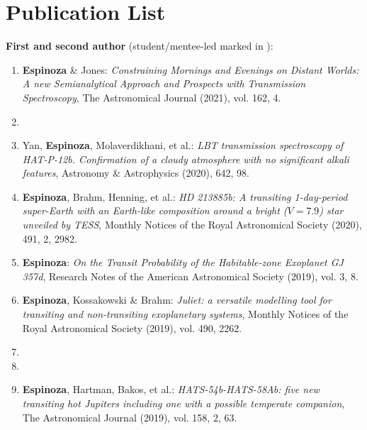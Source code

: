 \documentclass[12pt, a4paper]{article} %
\begin{document}
\section*{Publication List}
\begin{flushleft}%
  \setlength{\leftskip}{0.2cm}%
\textbf{First and second author} (student/mentee-led marked in {}):
\begin{enumerate}
\setlength\itemsep{0.05cm}
\item \textbf{Espinoza} \& Jones: \textit{Constraining Mornings and Evenings on Distant Worlds: A new Semianalytical Approach and Prospects with Transmission Spectroscopy}, The Astronomical Journal (2021), vol. 162, 4.
\item  {}
\item Yan, \textbf{Espinoza}, Molaverdikhani, et al.: \textit{LBT transmission spectroscopy of HAT-P-12b. Confirmation of a cloudy atmosphere with no significant alkali features}, Astronomy \& Astrophysics (2020), 642, 98.
\item \textbf{Espinoza}, Brahm, Henning, et al.: \textit{HD 213885b: A transiting 1-day-period super-Earth with an Earth-like composition around a bright ($V=7.9$) star unveiled by TESS}, Monthly Notices of the Royal Astronomical Society (2020), 491, 2, 2982.
\item \textbf{Espinoza}: \textit{On the Transit Probability of the Habitable-zone Exoplanet GJ 357d}, Research Notes of the American Astronomical Society (2019), vol. 3, 8.
\item \textbf{Espinoza}, Kossakowski \& Brahm: \textit{Juliet: a versatile modelling tool for transiting and non-transiting exoplanetary systems}, Monthly Notices of the Royal Astronomical Society (2019), vol. 490, 2262. 
\item  {}
\item  {}
\item \textbf{Espinoza}, Hartman, Bakos, et al.: \textit{HATS-54b-HATS-58Ab: five new transiting hot Jupiters including one with a possible temperate companion}, The Astronomical Journal (2019), vol. 158, 2, 63.

\end{enumerate}
\end{flushleft}
\end{document}
